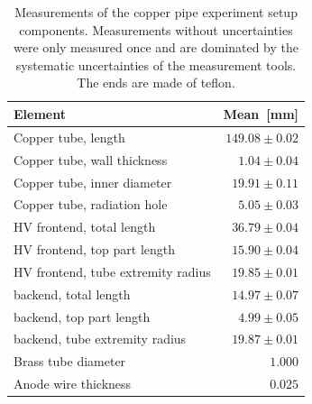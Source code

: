 \begin{table}[H]
	\begin{tabularx}{\linewidth}{p{4.5cm}r}
		\textbf{Element} & \textbf{Mean}~{[}mm{]}          \\ \hline
		Copper tube, length            & $149.08 \pm 0.02$ \\
		Copper tube, wall thickness    & $1.04 \pm 0.04$  \\
		Copper tube, inner diameter    & $19.91 \pm 0.11$  \\
		Copper tube, radiation hole    & $5.05 \pm 0.03$  \\
		HV frontend,  total length         & $36.79 \pm 0.04$  \\
		HV frontend, top part length       & $15.90 \pm 0.04$  \\
		HV frontend, tube extremity radius & $19.85 \pm 0.01$  \\
		backend, total length             & $14.97 \pm 0.07$  \\
		backend, top part length          & $4.99 \pm 0.05$  \\
		backend, tube extremity radius    & $19.87 \pm 0.01$  \\
		Brass tube diameter            & $1.000$           \\
		Anode wire thickness           & $0.025$           \\ \hline
	\end{tabularx}
\caption{Measurements of the copper pipe experiment setup components. Measurements without uncertainties were only measured once and are dominated by the systematic uncertainties of the measurement tools. The ends are made of teflon.}
\label{Tab:coppercan_sizes}
\end{table}




















